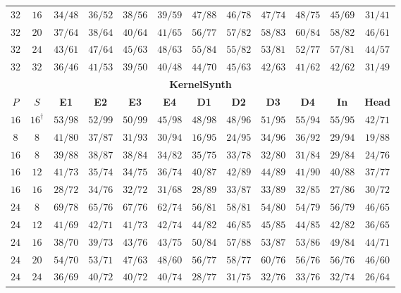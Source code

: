 \begin{table}[!tbp]
\begin{tabular}{@{}cccccccccccc@{}}
        $32$ & $16$ & $34/48$ & $36/52$ & $38/56$ & $39/59$ & $47/88$ & $46/78$ & $47/74$ & $48/75$ & $45/69$ & $31/41$ \\
        $32$ & $20$ & $37/64$ & $38/64$ & $40/64$ & $41/65$ & $56/77$ & $57/82$ & $58/83$ & $60/84$ & $58/82$ & $46/61$ \\
        $32$ & $24$ & $43/61$ & $47/64$ & $45/63$ & $48/63$ & $55/84$ & $55/82$ & $53/81$ & $52/77$ & $57/81$ & $44/57$ \\
        $32$ & $32$ & $36/46$ & $41/53$ & $39/50$ & $40/48$ & $44/70$ & $45/63$ & $42/63$ & $41/62$ & $42/62$ & $31/49$ \\
        \midrule
        \multicolumn{12}{c}{\textbf{KernelSynth}} \\
        \midrule
        \textbf{$P$} & \textbf{$S$} & \textbf{E1} & \textbf{E2} & \textbf{E3} & \textbf{E4} & \textbf{D1} & \textbf{D2} & \textbf{D3} & \textbf{D4} & \textbf{In} & \textbf{Head} \\
        \midrule
        $16$ & $16^{\dagger}$ & $53/98$ & $52/99$ & $50/99$ & $45/98$ & $48/98$ & $48/96$ & $51/95$ & $55/94$ & $55/95$ & $42/71$ \\
        \midrule
        \addlinespace[2pt]
        $8$ & $8$ & $41/80$ & $37/87$ & $31/93$ & $30/94$ & $16/95$ & $24/95$ & $34/96$ & $36/92$ & $29/94$ & $19/88$ \\
        \addlinespace[2pt]
        $16$ & $8$ & $39/88$ & $38/87$ & $38/84$ & $34/82$ & $35/75$ & $33/78$ & $32/80$ & $31/84$ & $29/84$ & $24/76$ \\
        $16$ & $12$ & $41/73$ & $35/74$ & $34/75$ & $36/74$ & $40/87$ & $42/89$ & $44/89$ & $41/90$ & $40/88$ & $37/77$ \\
        $16$ & $16$ & $28/72$ & $34/76$ & $32/72$ & $31/68$ & $28/89$ & $33/87$ & $33/89$ & $32/85$ & $27/86$ & $30/72$ \\
        \addlinespace[2pt]
        $24$ & $8$ & $69/78$ & $65/76$ & $67/76$ & $62/74$ & $56/81$ & $58/81$ & $54/80$ & $54/79$ & $56/79$ & $46/65$ \\
        $24$ & $12$ & $41/69$ & $42/71$ & $41/73$ & $42/74$ & $44/82$ & $46/85$ & $45/85$ & $44/85$ & $42/82$ & $36/65$ \\
        $24$ & $16$ & $38/70$ & $39/73$ & $43/76$ & $43/75$ & $50/84$ & $57/88$ & $53/87$ & $53/86$ & $49/84$ & $44/71$ \\
        $24$ & $20$ & $54/70$ & $53/71$ & $47/63$ & $48/60$ & $56/77$ & $58/77$ & $60/76$ & $56/76$ & $56/76$ & $46/60$ \\
        $24$ & $24$ & $36/69$ & $40/72$ & $40/72$ & $40/74$ & $28/77$ & $31/75$ & $32/76$ & $33/76$ & $32/74$ & $26/64$ \\

\end{tabular}
\end{table}
